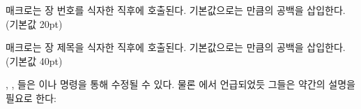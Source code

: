 \cmd{\afterchapternum} 매크로는 장 번호를 식자한 직후에 호출된다.
기본값으로는 \lnc{\midchapskip} 만큼의 공백을 삽입한다. (기본값 20pt)

\cmd{\afterchaptertitle} 매크로는 장 제목을 식자한 직후에 호출된다.
기본값으로는 \lnc{\midchapskip} 만큼의 공백을 삽입한다. (기본값 40pt)

\lnc{\beforechapskip}, \lnc{\midchapskip}, \lnc{\afterchapskip} 들은
\cmd{\setlength} 이나 \cmd{\addtolength} 명령을 통해 수정될 수 있다.
물론  에서 언급되었듯 그들은 약간의 설명을 필요로 한다:
\begingroup
\medskip
\setlength\overfullrule{5pt}
\setlength\unitlength{\textwidth}
\addtolength{}
\renewcommand\descriptionlabel[1]{\hspace\labelsep\parbox{\unitlength}{\cs{#1}}}
